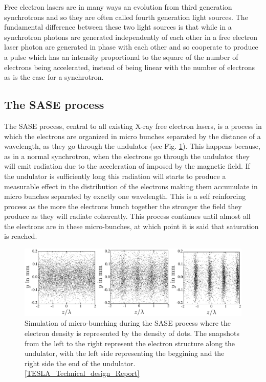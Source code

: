 Free electron lasers are in many ways an evolution from third generation
synchrotrons and so they are often called fourth generation light sources. The
fundamental difference between these two light sources is that while in a
synchrotron photons are generated independently of each other in a free electron
laser photon are generated in phase with each other and so cooperate to produce
a pulse which has an intensity proportional to the square of the number of
electrons being accelerated, instead of being linear with the number of
electrons as is the case for a synchrotron.

\subsection{The SASE process}

The SASE process, central to all existing X-ray free electron lasers, is a
process in which the electrons are organized in micro bunches separated by the
distance of a wavelength, as they go through the undulator (see
Fig. \ref{Fig:Brilliance}). This happens because,
as in a normal synchrotron, when the electrons go through the undulator they
will emit radiation due to the acceleration of imposed by the magnetic field. If
the undulator is sufficiently long this radiation will starts to produce a
measurable effect in the distribution of the electrons making them accumulate in
micro bunches separated by exactly one wavelength. This is a self reinforcing
process as the more the electrons bunch together the stronger the field they
produce as they will radiate coherently. This process continues until almost all
the electrons are in these micro-bunches, at which point it is said that
saturation is reached. 

\begin{figure}[h]
\centering
  \includegraphics[width=1.0 \columnwidth]{micro-bunching.png}
  \caption{Simulation of micro-bunching during the SASE process where the
    electron density is represented by the density of dots. The snapshots
    from the left to the right represent the electron structure along the
    undulator, with the left side representing the beggining and the right side
    the end of the undulator. \ref{TESLA_Technical_design_Report}}
  \label{Fig:Brilliance}
\end{figure}

